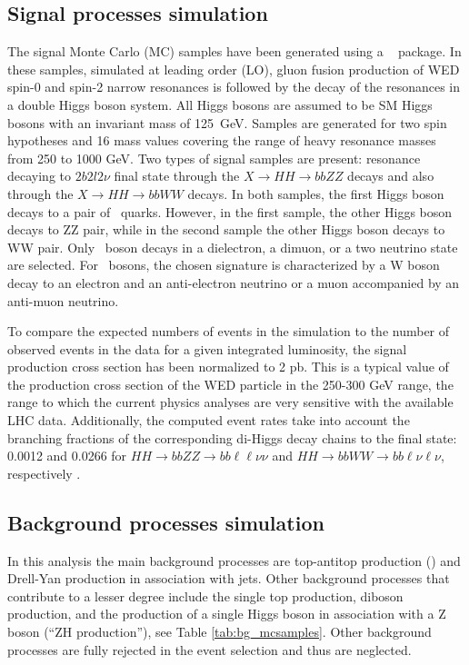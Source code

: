 \subsection{Signal processes simulation\label{sec:signalMC}}

The signal Monte Carlo (MC) samples have been generated using a {\MGMCatNLO} ~\cite{Alwall:2014hca} package. In these samples, simulated at leading order (LO), gluon fusion production of WED spin-0 and spin-2 narrow resonances is
followed by the decay of the resonances in a double Higgs boson system. All Higgs bosons are assumed to be SM Higgs bosons with an invariant mass of 125~GeV. Samples are generated for two spin hypotheses and 16 mass values covering the range of heavy resonance masses from 250 to 1000 GeV. Two types of signal samples are present: resonance decaying to $2b 2l 2\nu$ final state through the $X \rightarrow HH \rightarrow bbZZ$ decays and also through the $X \rightarrow HH \rightarrow bbWW$ decays. In both samples, the first Higgs boson decays to a pair of \PQb ~quarks. However, in the first sample, the other Higgs boson decays to ZZ pair, while in the second sample the other Higgs boson decays to WW pair. Only \PZ ~boson decays in a dielectron, a dimuon, or a two neutrino state are selected. For \PW ~bosons, the chosen signature is characterized by a W boson decay to an electron and an anti-electron neutrino or a muon accompanied by an anti-muon neutrino.

To compare the expected numbers of events in the simulation to the number of observed events in the data for a given integrated luminosity, the signal production cross section has been normalized to 2 pb. This is a typical value of the production cross section of the WED particle in the 250-300 GeV range, the range to which the current physics analyses are very sensitive with the available LHC data. Additionally, the computed event rates take into account the branching fractions of the corresponding di-Higgs decay chains to the final state: 0.0012 and 0.0266 for $HH\to bbZZ\to bb\ell\ell\nu\nu$ and $HH\to bbWW\to bb\ell\nu\ell\nu$, respectively \cite{CERNYR4}.

\subsection{Background processes simulation\label{sec:bkgMC}}
In this analysis the main background processes are top-antitop production (\ttbar) and Drell-Yan production in association with jets. 
Other background processes that contribute to a lesser degree include the single top production, diboson production, and the production of a single Higgs boson in association with a Z boson (``ZH production''), see Table \ref{tab:bg_mcsamples}. Other background processes are fully rejected in the event selection and thus are neglected. 

